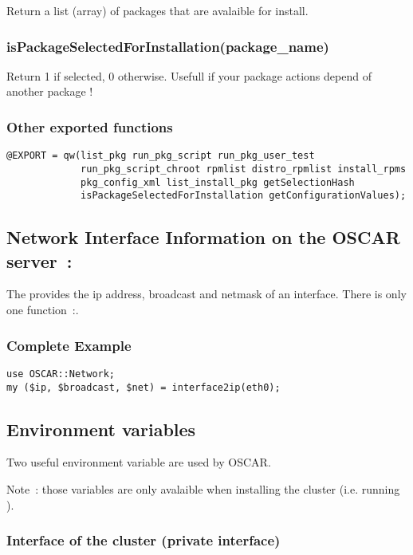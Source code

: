 Return a list (array) of packages that are avalaible for install.

\subsubsection{isPackageSelectedForInstallation(package\_name)}

Return 1 if selected, 0 otherwise. Usefull if your package actions depend of
another package !

\subsubsection{Other exported functions}

\begin{verbatim}
@EXPORT = qw(list_pkg run_pkg_script run_pkg_user_test
             run_pkg_script_chroot rpmlist distro_rpmlist install_rpms
             pkg_config_xml list_install_pkg getSelectionHash
             isPackageSelectedForInstallation getConfigurationValues);
\end{verbatim}

\subsection{Network Interface Information on the OSCAR server~: }

The  provides the ip address, broadcast and netmask
of an interface. There is only one function~:.

\subsubsection{Complete Example}

\begin{verbatim}
use OSCAR::Network;
my ($ip, $broadcast, $net) = interface2ip(eth0);
\end{verbatim}

\subsection{Environment variables}

Two useful environment variable are used by OSCAR. 

Note~: those variables are only avalaible when installing the cluster (i.e. running
).

\subsubsection{Interface of the cluster (private interface)}

